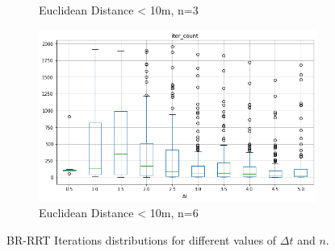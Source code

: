\documentclass[a4paper,12pt]{article}
\DeclareRobustCommand{\[}{\begin{equation}}
\DeclareRobustCommand{\]}{\end{equation}}
\numberwithin{equation}{section}
\numberwithin{algorithm}{section}
\begin{document}
\begin{figure}[H]
\begin{subfigure}[b]{0.6\textwidth}
        \caption{Euclidean Distance < 10m, n=3}
    \end{subfigure}
    \begin{subfigure}[b]{0.6\textwidth}
        \includegraphics[scale=1,width=\textwidth]{images/brrrt_iters_low_n_6.png}
        \caption{Euclidean Distance < 10m, n=6}
    \end{subfigure}
    \caption{BR-RRT Iterations distributions for different values of $\Delta{t}$ and $n$.}
    \label{fig:brrrt_iters_low}
\end{figure}
\end{document}
